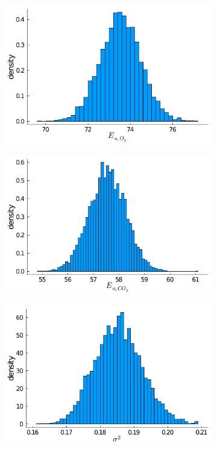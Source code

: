 \begin{figure}[H]
	\centering
	\begin{subfigure}[b]{0.3\textwidth}
		\includegraphics[width=1.0\textwidth]{figure/paper 2/nuisance1.pdf}
	\end{subfigure}
	\begin{subfigure}[b]{0.3\textwidth}
		\centering
		\includegraphics[width=1.0\textwidth]{figure/paper 2/nuisance2.pdf}
	\end{subfigure}
	\begin{subfigure}[b]{0.3\textwidth}
		\centering
		\includegraphics[width=1.0\textwidth]{figure/paper 2/nuisance3.pdf}

\end{subfigure}
\end{figure}
